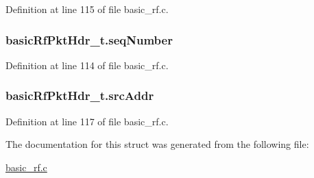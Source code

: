 Definition at line 115 of file basic\_\-rf.c.

\hypertarget{structbasic_rf_pkt_hdr__t_aaffb480584827f92ee83bf5d3146392f}{
\subsubsection[{seqNumber}]{ {\bf basicRfPktHdr\_\-t.seqNumber}}}
\label{structbasic_rf_pkt_hdr__t_aaffb480584827f92ee83bf5d3146392f}


Definition at line 114 of file basic\_\-rf.c.

\hypertarget{structbasic_rf_pkt_hdr__t_a6eaff5d52b1bd0bca9050d9ce0b18144}{
\subsubsection[{srcAddr}]{ {\bf basicRfPktHdr\_\-t.srcAddr}}}
\label{structbasic_rf_pkt_hdr__t_a6eaff5d52b1bd0bca9050d9ce0b18144}


Definition at line 117 of file basic\_\-rf.c.



The documentation for this struct was generated from the following file:\begin{DoxyCompactItemize}
\item 
\hyperlink{basic__rf_8c}{basic\_\-rf.c}\end{DoxyCompactItemize}
